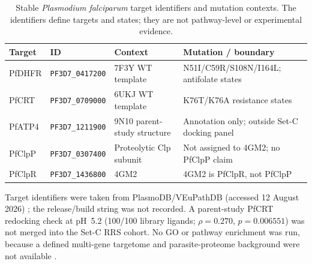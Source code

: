 \documentclass[journal=jcisd8,manuscript=suppinfo,layout=traditional]{achemso}
\begin{document}
\begin{table}[htbp]
\centering
\scriptsize
\setlength{\tabcolsep}{0pt}
\caption{Stable \textit{Plasmodium falciparum} target identifiers and mutation contexts. The identifiers define targets and states; they are not pathway-level or experimental evidence.}
\label{tab:s5_plasmodb}
\begin{tabularx}{\textwidth}{>{\raggedright\arraybackslash}p{} >{\raggedright\arraybackslash}p{} >{\raggedright\arraybackslash}p{} X}
\toprule
Target & ID & Context & Mutation / boundary \\
\midrule
PfDHFR & \scriptsize\texttt{PF3D7\_0417200}\normalsize & 7F3Y WT template & N51I/C59R/S108N/I164L; antifolate states \\
PfCRT & \scriptsize\texttt{PF3D7\_0709000}\normalsize & 6UKJ WT template & K76T/K76A resistance states \\
PfATP4 & \scriptsize\texttt{PF3D7\_1211900}\normalsize & 9N10 parent-study structure & Annotation only; outside Set-C docking panel \\
PfClpP & \scriptsize\texttt{PF3D7\_0307400}\normalsize & Proteolytic Clp subunit & Not assigned to 4GM2; no PfClpP claim \\
PfClpR & \scriptsize\texttt{PF3D7\_1436800}\normalsize & 4GM2 & 4GM2 is PfClpR, not PfClpP \\
\bottomrule
\end{tabularx}
\normalsize
\setlength{\tabcolsep}{6pt}
\end{table}

Target identifiers were taken from PlasmoDB/VEuPathDB (accessed 12 August 2026) \citep{plasmodb_2026}; the release/build string was not recorded. A parent-study PfCRT redocking check at pH~5.2 (100/100 library ligands; $\rho = 0.270$, $p = 0.006551$) was not merged into the Set-C RRS cohort. No GO or pathway enrichment was run, because a defined multi-gene targetome and parasite-proteome background were not available \citep{Trapotsi2022MoA}.

\end{document}
